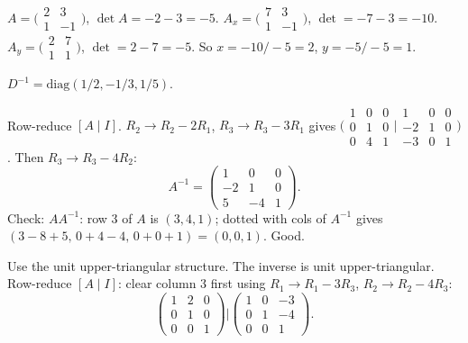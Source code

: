 \begin{solutions}
    \item $A = \bigl(\begin{smallmatrix} 2 & 3 \\ 1 & -1 \end{smallmatrix}\bigr)$, $\det A = -2 - 3 = -5$. $A_{x} = \bigl(\begin{smallmatrix} 7 & 3 \\ 1 & -1 \end{smallmatrix}\bigr)$, $\det = -7 - 3 = -10$. $A_{y} = \bigl(\begin{smallmatrix} 2 & 7 \\ 1 & 1 \end{smallmatrix}\bigr)$, $\det = 2 - 7 = -5$. So $x = -10/-5 = 2$, $y = -5/-5 = 1$.
    \item $D^{-1} = \mathrm{diag}(1/2, -1/3, 1/5)$.
    \item Row-reduce $[A \mid I]$. $R_{2} \to R_{2} - 2 R_{1}$, $R_{3} \to R_{3} - 3 R_{1}$ gives $\bigl(\begin{smallmatrix} 1 & 0 & 0 \\ 0 & 1 & 0 \\ 0 & 4 & 1 \end{smallmatrix}\big| \begin{smallmatrix} 1 & 0 & 0 \\ -2 & 1 & 0 \\ -3 & 0 & 1 \end{smallmatrix}\bigr)$. Then $R_{3} \to R_{3} - 4 R_{2}$:
    \[
    A^{-1} = \begin{pmatrix} 1 & 0 & 0 \\ -2 & 1 & 0 \\ 5 & -4 & 1 \end{pmatrix}.
    \]
    Check: $A A^{-1}$: row 3 of $A$ is $(3, 4, 1)$; dotted with cols of $A^{-1}$ gives $(3 - 8 + 5,\, 0 + 4 - 4,\, 0 + 0 + 1) = (0, 0, 1)$. Good.
    \item Use the unit upper-triangular structure. The inverse is unit upper-triangular. Row-reduce $[A \mid I]$: clear column 3 first using $R_{1} \to R_{1} - 3 R_{3}$, $R_{2} \to R_{2} - 4 R_{3}$:
    \[
    \begin{pmatrix} 1 & 2 & 0 \\ 0 & 1 & 0 \\ 0 & 0 & 1 \end{pmatrix} \Big| \begin{pmatrix} 1 & 0 & -3 \\ 0 & 1 & -4 \\ 0 & 0 & 1 \end{pmatrix}.
\]
\end{solutions}
